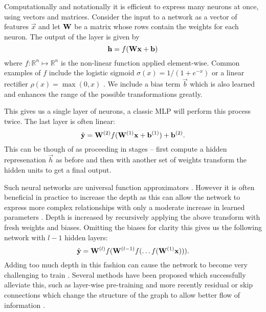 Computationally and
notationally it is efficient to express many neurons at once, using vectors and matrices.
Consider the input to a network as a vector of features \(\vec{x}\)
and let \(\mathbf{W}\) be a matrix
whose rows contain the weights for each neuron. The output of the layer is given by
\begin{equation} \label{eq:matperceptron}
	\mathbf{h} = f(\mathbf{W}\mathbf{x} + \mathbf{b})
\end{equation} where \(f: \mathbb{R}^n \mapsto \mathbb{R}^n\) is the non-linear function applied
element-wise. Common examples of \(f\)
include the logistic sigmoid \(\sigma(x) = 1/(1 + e^{-x})\) or
a linear rectifier \(\rho(x) = \max(0, x)\) \autocite{Nair}. We include a bias term \(\vec{b}\)
which is also learned and enhances the range of the possible transformations greatly.

This gives us a single layer of neurons, a classic MLP will perform this process twice. 
The last layer
is often linear:
\begin{equation}
	\hat{\mathbf{y}} = \mathbf{W}^{(2)}f(\mathbf{W}^{(1)}\mathbf{x} + \mathbf{b}^{(1)}) + \mathbf{b}^{(2)}.
\end{equation} This can be though of as proceeding in stages -- first compute a hidden represenation
\(\vec{h}\) as before
and then with another set of weights transform the hidden units to get a final output.

Such neural networks are universal function approximators \autocite{Hornik1989}. However it is often
beneficial in practice to increase the depth as this can allow the network to express more complex
relationships
with only a moderate increase in learned parameters  \autocite{Telgarsky2016}. Depth is increased
by recursively applying the above transform with fresh weights and biases. Omitting the
biases for clarity this gives us the following network with \(l-1\) hidden layers:
\begin{equation}
	\hat{\mathbf{y}} = \mathbf{W}^{(l)}f(\mathbf{W}^{(l-1)}f(\dots f(\mathbf{W}^{(1)}\mathbf{x}))).
\end{equation} Adding too much depth in this fashion can cause the network to become very challenging
to train \autocite{Glorot2010, Saxe2013}. Several methods have been proposed which successfully
alleviate this, such as layer-wise pre-training \autocite{Hinton2006,Vincent2010} and more
recently residual or skip connections which change the structure of the graph to allow better flow of 
information \autocite{He2015, Huang2016}.

